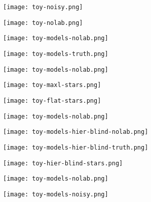 \documentclass{beamer}
\begin{document}
\begin{frame}
\texttt{[image: toy-noisy.png]}
\end{frame}

\begin{frame}
\texttt{[image: toy-nolab.png]}
\end{frame}

\begin{frame}
\texttt{[image: toy-models-nolab.png]}
\end{frame}

\begin{frame}
\texttt{[image: toy-models-truth.png]}
\end{frame}

\begin{frame}
\texttt{[image: toy-models-nolab.png]}
\end{frame}

\begin{frame}
\texttt{[image: toy-maxl-stars.png]}
\end{frame}

\begin{frame}
\texttt{[image: toy-flat-stars.png]}
\end{frame}

\begin{frame}
\texttt{[image: toy-models-nolab.png]}
\end{frame}

\begin{frame}
\texttt{[image: toy-models-hier-blind-nolab.png]}
\end{frame}

\begin{frame}
\texttt{[image: toy-models-hier-blind-truth.png]}
\end{frame}

\begin{frame}
\texttt{[image: toy-hier-blind-stars.png]}
\end{frame}

\begin{frame}
\texttt{[image: toy-models-nolab.png]}
\end{frame}

\begin{frame}
\texttt{[image: toy-models-noisy.png]}
\end{frame}
\end{document}
